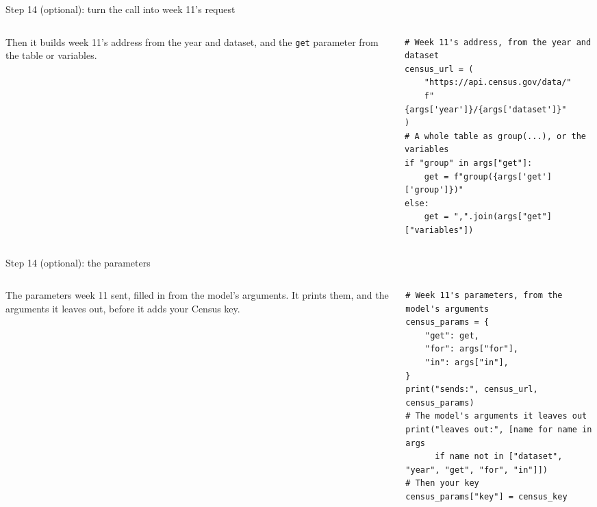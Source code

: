 \documentclass[9pt,aspectratio=169]{beamer}
\begin{document}
\begin{frame}[fragile]{Step 14 (optional): turn the call into week 11's request}
    \begin{columns}[T]
        \begin{column}{0.37\textwidth}
            Then it builds week 11's address from the year and dataset, and the \texttt{get} parameter from the table or variables.
        \end{column}
        \begin{column}{0.6\textwidth}
\begin{lstlisting}
# Week 11's address, from the year and dataset
census_url = (
    "https://api.census.gov/data/"
    f"{args['year']}/{args['dataset']}"
)
# A whole table as group(...), or the variables
if "group" in args["get"]:
    get = f"group({args['get']['group']})"
else:
    get = ",".join(args["get"]["variables"])
\end{lstlisting}
        \end{column}
    \end{columns}
\end{frame}

\begin{frame}[fragile]{Step 14 (optional): the parameters}
    \begin{columns}[T]
        \begin{column}{0.37\textwidth}
            The parameters week 11 sent, filled in from the model's arguments. It prints them, and the arguments it leaves out, before it adds your Census key.
        \end{column}
        \begin{column}{0.6\textwidth}
\begin{lstlisting}
# Week 11's parameters, from the model's arguments
census_params = {
    "get": get,
    "for": args["for"],
    "in": args["in"],
}
print("sends:", census_url, census_params)
# The model's arguments it leaves out
print("leaves out:", [name for name in args
      if name not in ["dataset", "year", "get", "for", "in"]])
# Then your key
census_params["key"] = census_key
\end{lstlisting}
        \end{column}
    \end{columns}
\end{frame}
\end{document}
